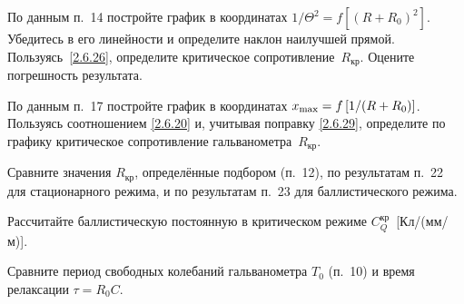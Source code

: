 \begin{lab:task}
    По данным п.~14 постройте график в координатах
    $1/\Theta^2=f[(R+R_0)^2]$. Убедитесь в его линейности и определите
    наклон наилучшей прямой. Пользуясь~\eqref{2.6.26},
    определите критическое сопротивление~$R_{кр}$. Оцените погрешность результата.

	\item По данным п.~17 постройте график в координатах 
    $x_{\rm max} = f \left [1/(R + R_0) \right]$. 
    Пользуясь соотношением \eqref{2.6.20} и, учитывая поправку
    \eqref{2.6.29}, определите по графику критическое сопротивление 
    гальванометра~$R_{кр}$.


	\item Сравните значения $R_{\text{кр}}$, определённые подбором (п.~12),
     по результатам п.~22 для стационарного режима, и по результатам 
     п.~23 для баллистического режима.

	\item Рассчитайте баллистическую постоянную в критическом режиме 
    $C_{Q}^{\text{кр}}$~[Кл/(мм/м)].

	\item Сравните период свободных колебаний гальванометра $T_0$ (п.~10) 
    и время релаксации $\tau = R_0 C$.
\end{lab:task}


